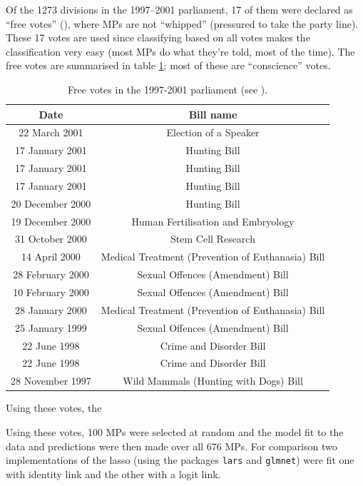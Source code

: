 Of the 1273 divisions in the 1997--2001 parliament, 17 of them were declared  as ``free votes'' (\cite{freevotes}), where MPs are not ``whipped'' (pressured to take the party line). These 17 votes are used since classifying based on all votes makes the classification very easy (most MPs do what they're told, most of the time). The free votes are summarised in table \ref{free-vote-description}; most of these are ``conscience'' votes.

\begin{table}  
\begin{centering}
\begin{tabular}{cc}
	Date & Bill name \\
    \hline
22 March 2001    &   Election of a Speaker \\
17 January 2001  &   Hunting Bill \\
17 January 2001  &   Hunting Bill \\
17 January 2001  &   Hunting Bill\\
20 December 2000 &   Hunting Bill \\
19 December 2000 &   Human Fertilisation and Embryology\\
31 October 2000  &   Stem Cell Research \\
14 April 2000    &   Medical Treatment (Prevention of Euthanasia) Bill \\
28 February 2000 &   Sexual Offences (Amendment) Bill \\
10 February 2000 &   Sexual Offences (Amendment) Bill \\
28 January 2000  &   Medical Treatment (Prevention of Euthanasia) Bill\\
25 January 1999  &   Sexual Offences (Amendment) Bill\\
22 June 1998     &  Crime and Disorder Bill \\
22 June 1998     &  Crime and Disorder Bill \\
28 November 1997 &  Wild Mammals (Hunting with Dogs) Bill\\
  \end{tabular}
\caption{Free votes in the 1997-2001 parliament (see \cite{freevotes}).}
\end{centering}
\label{free-vote-description}
\end{table}

Using these votes, the


Using these votes, 100 MPs were selected at random and the model fit to the data and predictions were then made over all 676 MPs. For comparison two implementations of the lasso (using the packages \texttt{lars} and \texttt{glmnet}) were fit one with identity link and the other with a logit link.

